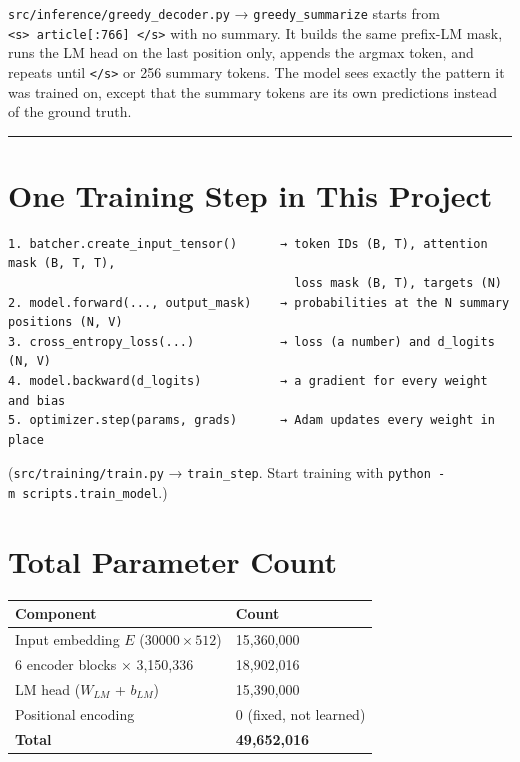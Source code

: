 \documentclass[11pt,a4paper,oneside]{report}
\begin{document}
\texttt{src/\allowbreak{}inference/\allowbreak{}greedy\_\allowbreak{}decoder.\allowbreak{}py} → \texttt{greedy\_\allowbreak{}summarize} starts from \texttt{\textless{}s\textgreater{}\ article{[}:766{]}\ \textless{}/s\textgreater{}} with no summary. It builds the same prefix-LM mask, runs the LM head on the last position only, appends the argmax token, and repeats until \texttt{\textless{}/\allowbreak{}s\textgreater{}} or 256 summary tokens. The model sees exactly the pattern it was trained on, except that the summary tokens are its own predictions instead of the ground truth.

\begin{center}\rule{0.5\linewidth}{0.5pt}\end{center}

\section{One Training Step in This Project}\label{one-training-step-in-this-project}

\begin{Verbatim}[fontsize=\small]
1. batcher.create_input_tensor()      → token IDs (B, T), attention mask (B, T, T),
                                        loss mask (B, T), targets (N)
2. model.forward(..., output_mask)    → probabilities at the N summary positions (N, V)
3. cross_entropy_loss(...)            → loss (a number) and d_logits (N, V)
4. model.backward(d_logits)           → a gradient for every weight and bias
5. optimizer.step(params, grads)      → Adam updates every weight in place
\end{Verbatim}

(\texttt{src/\allowbreak{}training/\allowbreak{}train.\allowbreak{}py} → \texttt{train\_\allowbreak{}step}. Start training with \texttt{python\ -m\ scripts.\allowbreak{}train\_\allowbreak{}model}.)

\section{Total Parameter Count}\label{total-parameter-count}

{\def\LTcaptype{none} %
\begin{longtable}[]{@{}ll@{}}
\toprule\noalign{}
Component & Count \\
\midrule\noalign{}
\endhead
\bottomrule\noalign{}
\endlastfoot
Input embedding \(E\) (\(30000 \times 512\)) & 15,360,000 \\
6 encoder blocks × 3,150,336 & 18,902,016 \\
LM head (\(W_{LM}\) + \(b_{LM}\)) & 15,390,000 \\
Positional encoding & 0 (fixed, not learned) \\
\textbf{Total} & \textbf{49,652,016} \\
\end{longtable}
}
\end{document}
